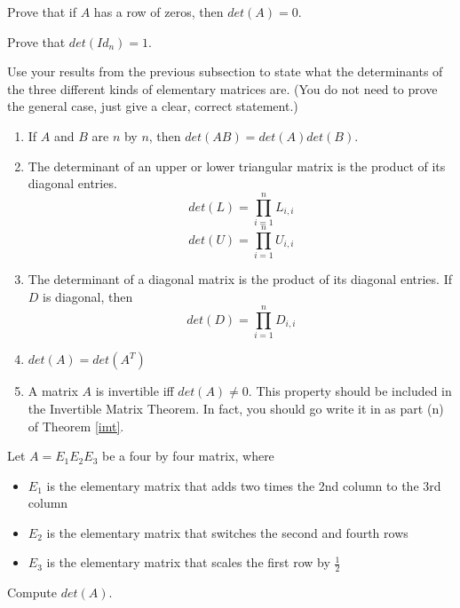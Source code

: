 \bq Prove that if $A$ has a row of zeros, then $det(A)=0$.
\eq

\bq Prove that $det(Id_n)=1$.
\eq

\bq Use your results from the previous subsection to state what the determinants of the three different kinds of elementary matrices are. (You do not need to prove the general case, just give a clear, correct statement.)
\eq

\begin{theorem}
\begin{enumerate}
\item If $A$ and $B$ are $n$ by $n$, then $det(AB)=det(A) det(B)$.
\item The determinant of an upper or lower triangular matrix is the product of its diagonal entries. $$det(L)=\prod_{i=1}^n L_{i,i}$$ $$det(U)=\prod_{i=1}^n U_{i,i}$$
\item The determinant of a diagonal matrix is the product of its diagonal entries. If $D$ is diagonal, then $$det(D)=\prod_{i=1}^n D_{i,i}$$
\item $det(A)=det(A^T)$
\item A matrix $A$ is invertible iff $det(A)\neq 0$. This property should be included in the Invertible Matrix Theorem. In fact, you should go write it in as part (n) of Theorem \ref{imt}.
\end{enumerate}
\end{theorem}

\begin{annotation}
\end{annotation}
\bq Let $A=E_1 E_2 E_3$ be a four by four matrix, where
\begin{itemize}
\item $E_1$ is the elementary matrix that adds two times the 2nd column to the 3rd column
\item $E_2$ is the elementary matrix that switches the second and fourth rows
\item $E_3$ is the elementary matrix that scales the first row by $\frac{1}{2}$
\end{itemize}
Compute $det(A)$.
\eq

